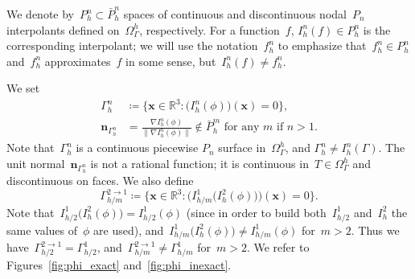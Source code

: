 \documentclass[12pt]{article}
\newcommand{\vect}[1]{\boldsymbol{\mathbf{#1}}}
\begin{document}
We denote by~$P_h^n \subset \bar P_h^n$ spaces of continuous and discontinuous nodal~$P_n$ interpolants defined on~$\Omega_\Gamma^h$, respectively. For a function~$f$, $I_h^n(f) \in P_h^n$ is the corresponding interpolant; we will use the notation~$f_h^n$ to emphasize that~$f_h^n \in P_h^n$ and~$f_h^n$ approximates~$f$ in some sense, but~$I_h^n(f) \ne f_h^n$.

We set
\begin{align}\label{gammah}
	\Gamma_h^n &\coloneqq \{ \vect x \in \mathbb{R}^3 : \big(I_h^n(\phi)\big)(\vect x) = 0 \}, \\
	\vect n_{\Gamma_h^n} &= \frac{\nabla I_h^n(\phi)}{\|\nabla I_h^n(\phi)\|} \not\in \bar{P}_h^m\text{ for any $m$ if $n > 1$}. \label{gammah:n}
\end{align}  
	Note that~$\Gamma_h^n$ is a continuous piecewise $P_n$ surface in~$\Omega_\Gamma^h$, and $\Gamma_h^n \ne I_h^n(\Gamma)$. The unit normal~$\vect n_{\Gamma_h^n}$ is not a rational function; it is continuous in~$T \in \Omega_\Gamma^h$ and discontinuous on faces. We also define
\begin{equation}\label{gammah2}
	\Gamma_{h/m}^{2 \rightarrow 1} \coloneqq \{ \vect x \in \mathbb{R}^3 : \Big(I_{h/m}^1\big(I_h^2(\phi)\big)\Big)(\vect x) = 0 \}.
\end{equation}  
Note that~$I_{h/2}^1\big(I_{h}^2(\phi)\big) = I_{h/2}^1(\phi)$ (since in order to build both~$I_{h/2}^1$ and~$I_{h}^2$ the same values of~$\phi$ are used), and~$I_{h/m}^1\big(I_{h}^2(\phi)\big) \ne I_{h/m}^1(\phi)$ for~$m > 2$. Thus we have~$\Gamma_{h/2}^{2 \rightarrow 1} = \Gamma_{h/2}^1$, and~$\Gamma_{h/m}^{2 \rightarrow 1} \ne \Gamma_{h/m}^1$ for~$m > 2$. We refer to Figures~\ref{fig:phi_exact} and~\ref{fig:phi_inexact}. 
\end{document}
